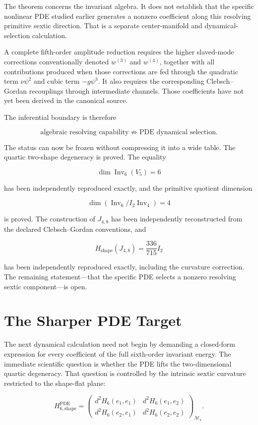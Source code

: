 The theorem concerns the invariant algebra. It does not establish that the specific nonlinear PDE studied earlier generates a nonzero coefficient along this resolving primitive sextic direction. That is a separate center-manifold and dynamical-selection calculation.

A complete fifth-order amplitude reduction requires the higher slaved-mode corrections conventionally denoted $w^{(3)}$ and $w^{(4)}$, together with all contributions produced when those corrections are fed through the quadratic term $\nu\psi^2$ and cubic term $-g\psi^3$. It also requires the corresponding Clebsch--Gordan recouplings through intermediate channels. Those coefficients have not yet been derived in the canonical source.

The inferential boundary is therefore

\[
\boxed{
\text{algebraic resolving capability}
\not\Rightarrow
\text{PDE dynamical selection}.
}
\]

The status can now be frozen without compressing it into a wide table. The quartic two-shape degeneracy is proved. The equality

\[
\dim\operatorname{Inv}_6(V_5)=6
\]

has been independently reproduced exactly, and the primitive quotient dimension

\[
\dim\left(\operatorname{Inv}_6/I_2\operatorname{Inv}_4\right)=4
\]

is proved. The construction of $J_{4,8}$ has been independently reconstructed from the declared Clebsch--Gordan conventions, and

\[
H_{\mathrm{shape}}(J_{4,8})=\frac{336}{715}I_2
\]

has been independently reproduced exactly, including the curvature correction. The remaining statement---that the specific PDE selects a nonzero resolving sextic component---is open.

\section{The Sharper PDE Target}

The next dynamical calculation need not begin by demanding a closed-form expression for every coefficient of the full sixth-order invariant energy. The immediate scientific question is whether the PDE lifts the two-dimensional quartic degeneracy. That question is controlled by the intrinsic sextic curvature restricted to the shape-flat plane:

\[
H_{6,\mathrm{shape}}^{\mathrm{PDE}}
=
\begin{pmatrix}
 d^2H_6(e_1,e_1) & d^2H_6(e_1,e_2)\\
 d^2H_6(e_2,e_1) & d^2H_6(e_2,e_2)
\end{pmatrix}_{\mathcal M_4}.
\]

